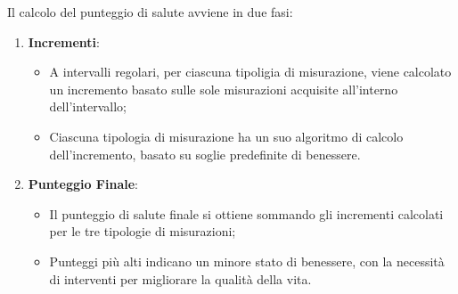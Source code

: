 Il calcolo del punteggio di salute avviene in due fasi:
\begin{enumerate}
    \item \textbf{Incrementi}: 
    \begin{itemize}
        \item A intervalli regolari, per ciascuna tipoligia di misurazione, viene calcolato un incremento basato sulle sole misurazioni acquisite all'interno dell'intervallo;
        \item Ciascuna tipologia di misurazione ha un suo algoritmo di calcolo dell'incremento, basato su soglie predefinite di benessere.
    \end{itemize}
    \item \textbf{Punteggio Finale}:
    \begin{itemize}
        \item Il punteggio di salute finale si ottiene sommando gli incrementi calcolati per le tre tipologie di misurazioni;
        \item Punteggi più alti indicano un minore stato di benessere, con la necessità di interventi per migliorare la qualità della vita.
    \end{itemize}
\end{enumerate}

